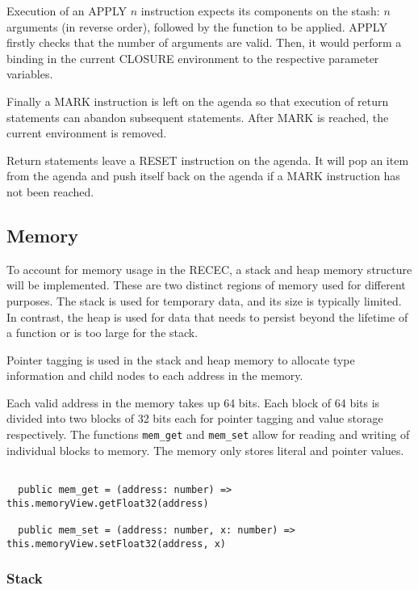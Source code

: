 \documentclass[a4paper]{article}
\begin{document}
Execution of an APPLY $n$ instruction expects its components on the stash: $n$ arguments (in reverse order), followed by the function to be applied. APPLY firstly checks that the number of arguments are valid. Then, it would perform a binding in the current CLOSURE environment to the respective parameter variables. 

Finally a MARK instruction is left on the agenda so that execution of return statements can abandon subsequent statements. After MARK is reached, the current environment is removed.

Return statements leave a RESET instruction on the agenda. It will pop an item from the agenda and push itself back on the agenda if a MARK instruction has not been reached.



\subsection{Memory}

To account for memory usage in the RECEC, a stack and heap memory structure will be implemented. These are two distinct regions of memory used for different purposes. The stack is used for temporary data, and its size is typically limited. In contrast, the heap is used for data that needs to persist beyond the lifetime of a function or is too large for the stack. 

Pointer tagging is used in the stack and heap memory to allocate type information and child nodes to each address in the memory. 

Each valid address in the memory takes up 64 bits. Each block of 64 bits is divided into two blocks of 32 bits each for pointer tagging and value storage respectively. The functions \texttt{mem\_get} and \texttt{mem\_set} allow for reading and writing of individual blocks to memory. The memory only stores literal and pointer values.

\begin{verbatim}

  public mem_get = (address: number) => this.memoryView.getFloat32(address)

  public mem_set = (address: number, x: number) => this.memoryView.setFloat32(address, x)

\end{verbatim}

\subsubsection{Stack}
\end{document}
